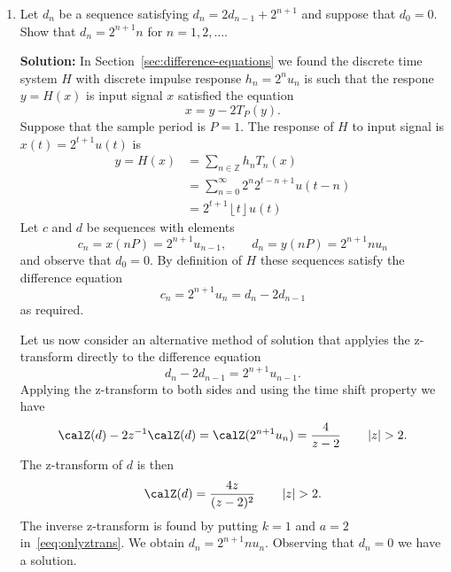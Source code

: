 \documentclass[11pt,a4paper]{book}
\theoremstyle{plain}
\numberwithin{equation}{section}
\newcommand{\ints}{{\mathbb Z}}
\newcommand{\abs}[1]{\left\vert #1 \right\vert}
\newcommand{\floor}[1]{{\left\lfloor #1 \right\rfloor}}
\newenvironment{solution}{\begin{footnotesize}\textbf{Solution:}}{\end{footnotesize}}
\newenvironment{excersizelist}{%
  \renewcommand*{\theenumi}{\thechapter.\arabic{enumi}}%
  \newcommand\itemadvanced{\stepcounter{enumi}\item[$\ast$\, \theenumi.]}
  \begin{enumerate}
}{%
  \end{enumerate}
}
\begin{document}
\begin{excersizelist}
\item \label{exer:fftcomplexity} Let $d_n$ be a sequence satisfying $d_n = 2 d_{n-1} + 2^{n+1}$ and suppose that $d_0 = 0$.  Show that $d_n = 2^{n+1}n$ for $n = 1,2,\dots$.  %
\begin{solution}
In Section~\ref{sec:difference-equations} we found the discrete time system $H$ with discrete impulse response $h_n = 2^{n}u_n$ is such that the respone $y = H(x)$ is input signal $x$ satisfied the equation
\[
x = y - 2 T_{P}(y).
\] 
Suppose that the sample period is $P=1$.  The response of $H$ to input signal is $x(t) = 2^{t+1}u(t)$ is
\begin{align*}
y = H(x) &= \sum_{n \in \ints} h_n T_{n}(x) \\
&= \sum_{n = 0}^\infty 2^n 2^{t-n+1}u(t-n) \\
&= 2^{t+1} \floor{t}u(t)
\end{align*}
Let $c$ and $d$ be sequences with elements 
\[
c_n = x(nP) = 2^{n+1}u_{n-1}, \qquad d_n = y(nP) = 2^{n+1}n u_n
\]
and observe that $d_0 = 0$.  By definition of $H$ these sequences satisfy the difference equation
\[
c_n = 2^{n+1}u_n = d_n - 2 d_{n-1}
\]
as required.

Let us now consider an alternative method of solution that applyies the z-transform directly to the difference equation
\[
 d_n - 2 d_{n-1} = 2^{n+1} u_{n-1}.
\]
Applying the z-transform to both sides and using the time shift property we have
\[
\calZ(d) - 2 z^{-1} \calZ(d) = \calZ(2^{n+1} u_n) = \frac{4}{z-2} \qquad \abs{z} > 2.
\]
The z-transform of $d$ is then
\[
\calZ(d) = \frac{4z}{(z-2)^2} \qquad \abs{z} > 2.
\]
The inverse z-transform is found by putting $k=1$ and $a = 2$ in~\eqref{eeq:onlyztrans}.  We obtain $d_n = 2^{n+1} n u_n$.  Observing that $d_n = 0$ we have a solution.
\end{solution}


\end{excersizelist}
\end{document}
